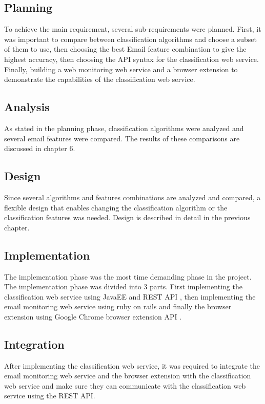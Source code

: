 \subsection{Planning}
To achieve the main requirement, several sub-requirements were planned.
First, it was important to compare between classification algorithms and choose 
a subset of them to use, then choosing the best Email feature combination to 
give the highest accuracy, then choosing the API syntax for the classification 
web service. Finally, building a web monitoring web service and a browser extension 
to demonstrate the capabilities of the classification web service.
\subsection{Analysis}
As stated in the planning phase, classification algorithms were analyzed and 
several email features were compared. The results of these comparisons are 
discussed in chapter 6.

\subsection{Design}
Since several algorithms and features combinations are analyzed and compared, 
a flexible design that enables changing the classification algorithm or the 
classification features was needed. Design is described in detail in the previous 
chapter.

\subsection{Implementation}
The implementation phase was the most time demanding phase in the project. The 
implementation phase was divided into 3 parts. First implementing the 
classification web service using JavaEE and REST API \cite{REST},
then implementing the email monitoring web service using ruby on rails \cite{ROR}
and finally the browser extension using Google Chrome browser extension API \cite{CHROME}.

\subsection{Integration}
After implementing the classification web service,
it was required to integrate the email monitoring web service and the browser extension with
the classification web service and make sure they can communicate with the classification web
service using the REST API.

